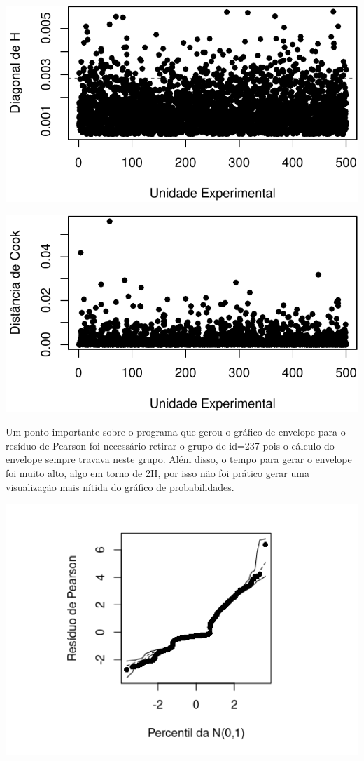 \documentclass[
  11pt,
]{article}
\begin{document}
\begin{center}\includegraphics{lista3_files/figure-latex/unnamed-chunk-9-1} \end{center}

\begin{center}\includegraphics{lista3_files/figure-latex/unnamed-chunk-9-2} \end{center}

Um ponto importante sobre o programa que gerou o gráfico de envelope para o resíduo de Pearson foi necessário retirar o grupo de id=237 pois o cálculo do envelope sempre travava neste grupo. Além disso, o tempo para gerar o envelope foi muito alto, algo em torno de 2H, por isso não foi prático gerar uma visualização mais nítida do gráfico de probabilidades.

\begin{center}\includegraphics[width=6.67in]{envelope_bernoulli} \end{center}
\end{document}
